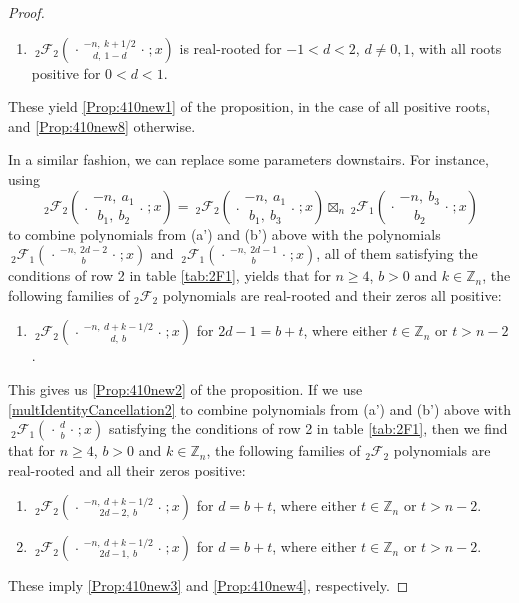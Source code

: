 \documentclass[reqno,11pt]{amsart}
\theoremstyle{remark}
\newcommand{\Z}{\mathbb{Z}}
\newcommand{\zz}{\mathbb{Z}}
\newcommand*\pFq[5]{%
 {\ }_{#1}{\mathcal F}_{#2}{\left(\genfrac..{0pt}{}{#3}{#4};#5\right)}%
}
\begin{document}
\begin{proof}
\begin{enumerate}
    \item[(d')]  
    $
    \pFq{2}{2}{-n,\ k+1/2}{d,\ 1-d}{x}
    $
    is real-rooted for $-1<d<2$, $d\neq 0, 1$, with all roots positive for $0<d<1$.
\end{enumerate}  
These yield \eqref{Prop:410new1} of the proposition, in the case of all positive roots, and  \eqref{Prop:410new8}  otherwise.

In a similar fashion, we can replace some parameters downstairs. For instance, using 
\begin{equation}
\label{multIdentityCancellation2}    
\pFq{2}{2}{-n,\ a_1}{b_1,\ b_2}{x}=\pFq{2}{2}{-n,\ a_1}{b_1, \ b_3}{x} \boxtimes_n \pFq{2}{1}{-n, \ b_3 }{b_2 }{x}
\end{equation}
to combine polynomials from (a') and (b') above  with the polynomials $\pFq{2}{1}{-n,\ 2d-2}{ b}{x}$ and $\pFq{2}{1}{-n,\ 2d-1}{ b}{x}$, all of them satisfying the conditions of row 2 in table \ref{tab:2F1}, yields that for $n\geq 4$, $b>0$ and $k\in \Z_n$, the following families of ${}_2\mathcal{F}_2$ polynomials are real-rooted and their zeros all positive:
\begin{enumerate} 
    \item[(a'')] 
    $
    \pFq{2}{2}{-n,\ d+k-1/2}{d,\ b}{x}
    $
     for $2d-1=b+t$, where either $t\in \zz_n$ or $t>n-2$.
\end{enumerate}
This gives us \eqref{Prop:410new2} of the proposition. If we use \eqref{multIdentityCancellation2} to combine polynomials from (a') and (b') above with $\pFq{2}{1}{d}{ b}{x}$ satisfying the conditions of row 2 in table \ref{tab:2F1}, then we find that for $n\geq 4$, $b>0$ and $k\in\Z_n$, the following families of ${}_2\mathcal{F}_2$ polynomials are real-rooted and all their zeros positive:
\begin{enumerate} 
    \item[(b'')] 
    $
    \pFq{2}{2}{-n,\  d+k-1/2}{2d-2,\ b}{x}
    $
    for $d=b+t$, where either $t\in \zz_n$ or $t>n-2$.


    \item[(c'')] 
    $
    \pFq{2}{2}{-n,\  d+k-1/2}{2d-1,\ b}{x}
    $
for $d=b+t$, where either $t\in \zz_n$ or $t>n-2$.
\end{enumerate}
These imply \eqref{Prop:410new3} and \eqref{Prop:410new4}, respectively.
\end{proof}
\end{document}
